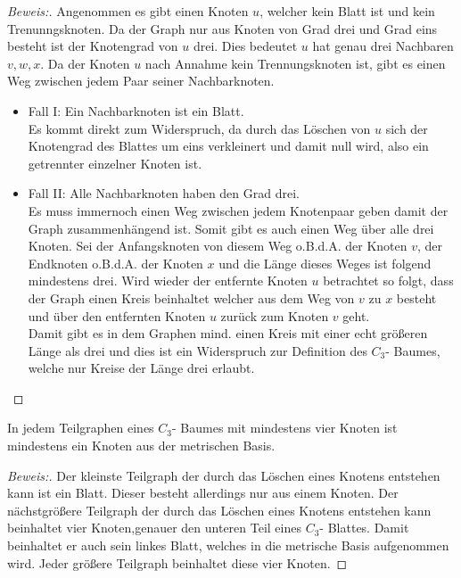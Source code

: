 \begin{proof}[Beweis:]
Angenommen es gibt einen Knoten $u$, welcher kein Blatt ist und kein Trenunngsknoten. Da der Graph nur aus Knoten von Grad drei und Grad eins besteht ist der Knotengrad von $u$ drei. Dies bedeutet $u$ hat genau drei Nachbaren $v,w,x$. Da
der Knoten $u$ nach Annahme kein Trennungsknoten ist, gibt es einen Weg zwischen jedem Paar seiner Nachbarknoten.
\begin{itemize}
\item Fall I: Ein Nachbarknoten ist ein Blatt.\\ Es kommt direkt zum Widerspruch, da durch das Löschen von $u$ sich der Knotengrad des Blattes um eins verkleinert und damit null wird, also ein getrennter einzelner Knoten ist.
\item Fall II: Alle Nachbarknoten haben den Grad drei.\\
Es muss immernoch einen Weg zwischen jedem Knotenpaar geben damit der Graph zusammenhängend ist. Somit gibt es auch einen Weg über alle drei Knoten. Sei der Anfangsknoten von diesem Weg o.B.d.A. der Knoten $v$, der Endknoten o.B.d.A. der Knoten $x$ und die Länge dieses Weges ist folgend mindestens drei. Wird wieder der entfernte Knoten $u$ betrachtet so folgt, dass der Graph einen Kreis beinhaltet welcher aus dem Weg von $v$ zu $x$ besteht und über den entfernten Knoten $u$ zurück zum Knoten $v$ geht.\\
Damit gibt es in dem Graphen mind. einen Kreis mit einer echt größeren Länge als drei und dies ist ein Widerspruch zur Definition des $C_{3}$- Baumes, welche nur Kreise der Länge drei erlaubt.
\end{itemize}
\end{proof}
\begin{lem}
\label{bkb2}
In jedem Teilgraphen eines $C_{3}$- Baumes mit mindestens vier Knoten ist mindestens ein Knoten aus der metrischen Basis.
\end{lem}
\begin{proof}[Beweis:]
Der kleinste Teilgraph der durch das Löschen eines Knotens entstehen kann ist ein Blatt. Dieser besteht allerdings nur aus einem Knoten. Der nächstgrößere Teilgraph der durch das Löschen eines Knotens entstehen kann beinhaltet vier Knoten,genauer den unteren Teil eines $C_{3}$- Blattes. Damit beinhaltet er auch sein linkes Blatt, welches in die metrische Basis aufgenommen wird. Jeder größere Teilgraph beinhaltet diese vier Knoten. %
\end{proof}
